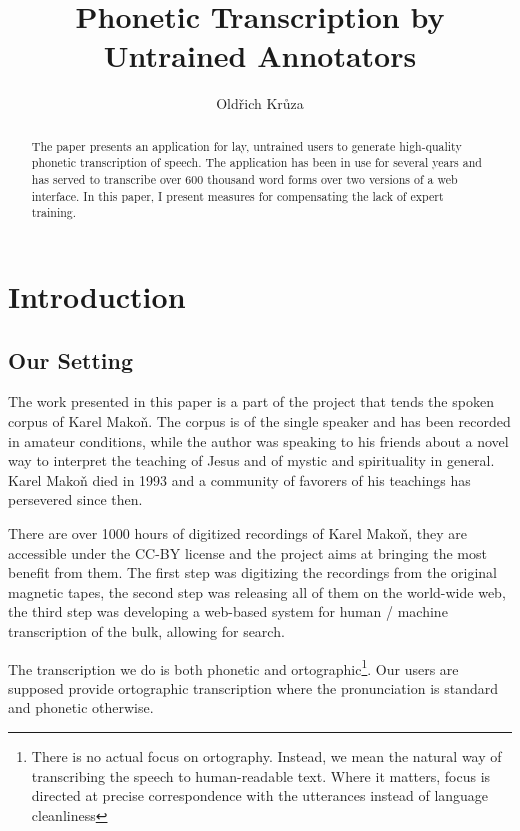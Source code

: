 \documentclass{itatnew}
\begin{document}
\title{Phonetic Transcription by Untrained Annotators}

\author{Oldřich Krůza}


\maketitle              %

\begin{abstract}
The paper presents an application for lay, untrained users to generate
high-quality phonetic transcription of speech. The application has been in use
for several years and has served to transcribe over 600 thousand word forms over
two versions of a web interface. In this paper, I present measures for
compensating the lack of expert training.
\end{abstract}

\section{Introduction}

\subsection{Our Setting}

The work presented in this paper is a part of the project that tends the spoken
corpus of Karel Mako\v{n}\cite{hajek2007cesky}. The corpus is of the single
speaker and has been recorded in amateur conditions, while the author was
speaking to his friends about a novel way to interpret the teaching of Jesus and
of mystic and spirituality in general. Karel Makoň died in 1993 and a community
of favorers of his teachings has persevered since then.

There are over 1000 hours of digitized recordings of Karel Makoň, they are
accessible under the CC-BY license and the project aims at bringing the most
benefit from them. The first step was digitizing the recordings from the
original magnetic tapes, the second step was releasing all of them on the
world-wide web, the third step was developing a web-based system for human /
machine transcription of the bulk, allowing for search.

The transcription we do is both phonetic and ortographic\footnote{There is no
actual focus on ortography. Instead, we mean the natural way of transcribing the
speech to human-readable text. Where it matters, focus is directed at precise
correspondence with the utterances instead of language cleanliness}. Our users
are supposed provide ortographic transcription where the pronunciation is
standard and phonetic otherwise.
\end{document}
